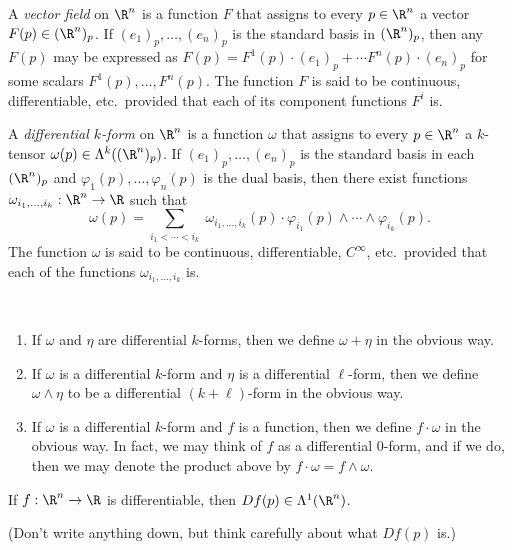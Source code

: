 \documentclass{book}
\begin{document}
\begin{definition}
A {\em vector field} on $\R^n$ is a function $F$ that assigns to every $p\in\R^n$ a vector
$F(p)\in (\R^n)_p$.  If $(e_1)_p, \ldots, (e_n)_p$ is the standard basis in $(\R^n)_p$,
then any $F(p)$ may be expressed as $F(p)=F^1(p)\cdot (e_1)_p+\cdots F^n(p)\cdot (e_n)_p$
for some scalars $F^1(p), \ldots, F^n(p)$.  The function $F$ is said to be continuous, differentiable,
etc.\ provided that each of its component functions $F^i$ is.
\end{definition}

\begin{definition}
A {\em differential $k$-form} on $\R^n$ is a function $\omega$ that assigns to every $p\in\R^n$ 
a $k$-tensor $\omega(p)\in \Lambda^k((\R^n)_p)$.  
If $(e_1)_p, \ldots, (e_n)_p$ is the standard basis in each $(\R^n)_p$ and 
$\varphi_1(p), \ldots, \varphi_n(p)$ is the dual basis, then there exist functions 
$\omega_{i_1, \ldots, i_k}:\R^n\to\R$ such that 
$$\omega (p)=\sum_{i_1< \cdots < i_k}\; \omega_{i_1, \ldots, i_k}(p)\cdot 
\varphi_{i_1}(p)\wedge \cdots\wedge \varphi_{i_k}(p).$$
The function $\omega$ is said to be continuous, differentiable, $C^{\infty}$, 
etc.\ provided that each of the functions $\omega_{i_1, \ldots, i_k}$ is.
\end{definition}

\begin{remark}\
\begin{enumerate}
\item
If $\omega$ and $\eta$ are differential $k$-forms, then we define 
$\omega +\eta$ in the obvious way.

\item
If $\omega$ is a differential $k$-form and $\eta$ is a differential 
$\ell$-form, then we define $\omega\wedge\eta$ to be a differential
$(k+\ell)$-form in the obvious way.

\item
If $\omega$ is a differential $k$-form and $f$ is a function, then we define
$f\cdot\omega$ in the obvious way.  In fact, we may think of $f$ as a
differential $0$-form, and if we do, then we may denote the product above by
$f\cdot\omega=f\wedge\omega$.
\end{enumerate}
\end{remark}

\begin{exercise}
If $f:\R^n\to\R$ is differentiable, then $Df(p)\in\Lambda^1(\R^n)$.

(Don't write anything down, but think carefully about what $Df(p)$ is.)
\end{exercise}
\end{document}
